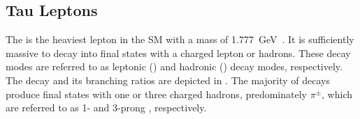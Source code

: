 

\subsection{Tau Leptons}%
\label{sec:tau_rec}

The \taulepton is the heaviest lepton in the SM with a mass of
\SI{1.777}{\GeV}~\cite{pdg2020}. It is sufficiently massive to decay into final
states with a charged lepton or hadrons. These decay modes are referred to as
leptonic (\taulep) and hadronic (\tauhad) decay modes, respectively. The
\taulepton decay and its branching ratios are depicted in
. The majority of \taulepton decays produce final
states with one or three charged hadrons, predominately $\pi^{\pm}$, which are
referred to as 1- and 3-prong \tauhad, respectively.

